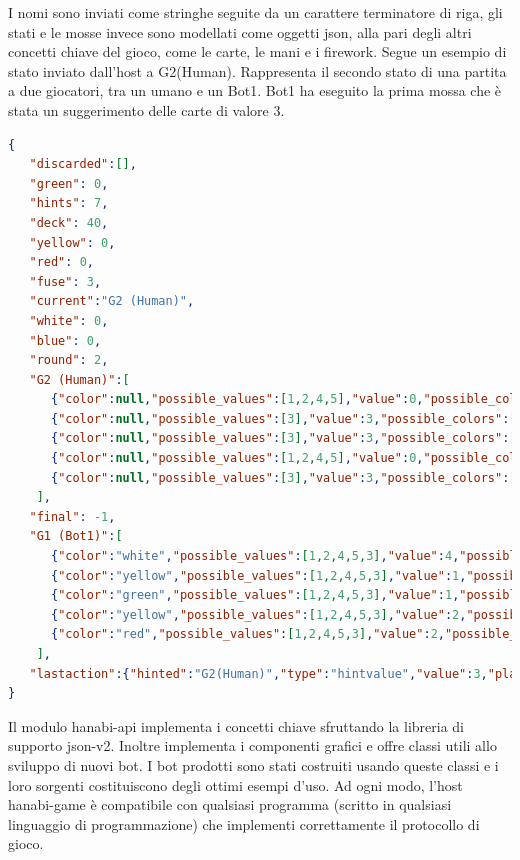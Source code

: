 \documentclass{article}
\begin{document}
\begin{flushleft}
I nomi sono inviati come stringhe seguite da un carattere terminatore di riga, gli stati e le mosse invece sono modellati come oggetti json, alla pari degli altri concetti chiave del gioco, come le carte, le mani e i firework.\newline
\newline
Segue un esempio di stato inviato dall'host a G2(Human). Rappresenta il secondo stato di una partita a due giocatori, tra un umano e un Bot1. Bot1 ha eseguito la prima mossa che è stata un suggerimento delle carte di valore 3.
\newline
\begin{lstlisting}[language=json,firstnumber=1]
{
   "discarded":[],
   "green": 0,
   "hints": 7,
   "deck": 40,
   "yellow": 0,
   "red": 0,
   "fuse": 3,
   "current":"G2 (Human)",
   "white": 0,
   "blue": 0,
   "round": 2,
   "G2 (Human)":[
      {"color":null,"possible_values":[1,2,4,5],"value":0,"possible_colors":["red","green","white","blue","yellow"]},
      {"color":null,"possible_values":[3],"value":3,"possible_colors":["red","green","white","blue","yellow"]},
      {"color":null,"possible_values":[3],"value":3,"possible_colors":["red","green","white","blue","yellow"]},
      {"color":null,"possible_values":[1,2,4,5],"value":0,"possible_colors":["red","green","white","blue","yellow"]},
      {"color":null,"possible_values":[3],"value":3,"possible_colors":["red","green","white","blue","yellow"]}
    ],
   "final": -1,
   "G1 (Bot1)":[
      {"color":"white","possible_values":[1,2,4,5,3],"value":4,"possible_colors":["red","green","white","blue","yellow"]},
      {"color":"yellow","possible_values":[1,2,4,5,3],"value":1,"possible_colors":["red","green","white","blue","yellow"]},
      {"color":"green","possible_values":[1,2,4,5,3],"value":1,"possible_colors":["red","green","white","blue","yellow"]},
      {"color":"yellow","possible_values":[1,2,4,5,3],"value":2,"possible_colors":["red","green","white","blue","yellow"]},
      {"color":"red","possible_values":[1,2,4,5,3],"value":2,"possible_colors":["red","green","white","blue","yellow"]}
    ],
   "lastaction":{"hinted":"G2(Human)","type":"hintvalue","value":3,"player":"G1(Bot1)"}
}
\end{lstlisting}
Il modulo hanabi-api implementa i concetti chiave sfruttando la libreria di supporto json-v2. Inoltre implementa i componenti grafici e offre classi utili allo sviluppo di nuovi bot. I bot prodotti sono stati costruiti usando queste classi e i loro sorgenti costituiscono degli ottimi esempi d'uso.\newline
\newline
Ad ogni modo, l'host hanabi-game è compatibile con qualsiasi programma (scritto in qualsiasi linguaggio di programmazione) che implementi correttamente il protocollo di gioco. 
\end{flushleft}
\end{document}
